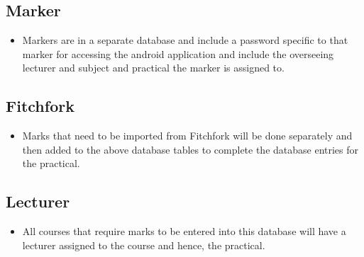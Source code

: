 \documentclass[11pt,a4paper]{article}
\begin{document}
\subsection{Marker}
\begin{itemize}
\item Markers are in a separate database and include a password specific to that marker for accessing the android application and include the overseeing lecturer and subject and practical the marker is assigned to.
\end{itemize}

\subsection{Fitchfork}
\begin{itemize}
\item Marks that need to be imported from Fitchfork will be done separately and then added to the above database tables to complete the database entries for the practical. 
\end{itemize}

\subsection{Lecturer}
\begin{itemize}
\item All courses that require marks to be entered into this database will have a lecturer assigned to the course and hence, the practical.
\end{itemize}
\end{document}
